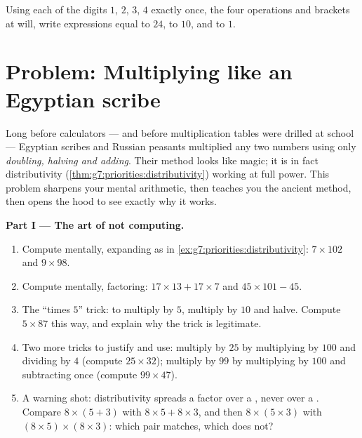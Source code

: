 \begin{exercise}[$\star\star\star$]\label{exo:g7:priorities:11}
Using each of the digits $1$, $2$, $3$, $4$ exactly once, the four
operations and brackets at will, write expressions equal to $24$, to
$10$, and to $1$.
\end{exercise}

\section{Problem: Multiplying like an Egyptian scribe}

\begin{problem}
\label{pb:g7:priorities:1}
Long before calculators --- and before multiplication tables were
drilled at school --- Egyptian scribes and Russian peasants
multiplied any two numbers using only \emph{doubling, halving and
adding}. Their method looks like magic; it is in fact
distributivity (\cref{thm:g7:priorities:distributivity}) working
at full power. This problem sharpens your mental arithmetic, then
teaches you the ancient method, then opens the hood to see exactly
why it works.

\medskip
\noindent\textbf{Part I --- The art of not computing.}
\begin{enumerate}
  \item Compute mentally, expanding as in
        \cref{ex:g7:priorities:distributivity}:
        $7 \times 102$ and $9 \times 98$.
  \item Compute mentally, factoring:
        $17 \times 13 + 17 \times 7$ and
        $45 \times 101 - 45$.
  \item The ``times $5$'' trick: to multiply by $5$, multiply by
        $10$ and halve. Compute $5 \times 87$ this way, and
        explain why the trick is legitimate.
  \item Two more tricks to justify and use: multiply by $25$ by
        multiplying by $100$ and dividing by $4$ (compute
        $25 \times 32$); multiply by $99$ by multiplying by $100$
        and subtracting once (compute $99 \times 47$).
  \item A warning shot: distributivity spreads a factor over a
        \emph{}, never over a . Compare
        $8 \times (5 + 3)$ with $8 \times 5 + 8 \times 3$, and
        then $8 \times (5 \times 3)$ with
        $(8 \times 5) \times (8 \times 3)$: which pair matches,
        which does not?
\end{enumerate}


\end{problem}
